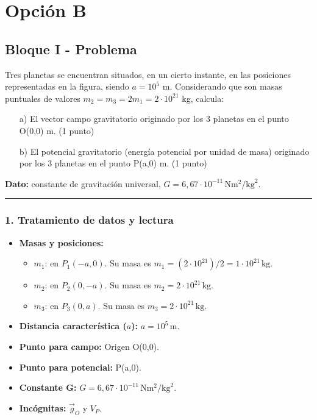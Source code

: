 \newpage

\section{Opción B}
\label{sec:B_2013_jul_ext}

\subsection{Bloque I - Problema}
\label{subsec:B1_2013_jul_ext}

\begin{cajaenunciado}
Tres planetas se encuentran situados, en un cierto instante, en las posiciones representadas en la figura, siendo $a = 10^5$ m. Considerando que son masas puntuales de valores $m_2=m_3=2m_1=2 \cdot 10^{21}$ kg, calcula:
\begin{enumerate}
    \item[a)] El vector campo gravitatorio originado por los 3 planetas en el punto O(0,0) m. (1 punto)
    \item[b)] El potencial gravitatorio (energía potencial por unidad de masa) originado por los 3 planetas en el punto P(a,0) m. (1 punto)
\end{enumerate}
\textbf{Dato:} constante de gravitación universal, $G = 6,67 \cdot 10^{-11} \, \text{N}\text{m}^2/\text{kg}^2$.
\end{cajaenunciado}
\hrule

\subsubsection*{1. Tratamiento de datos y lectura}
\begin{itemize}
    \item \textbf{Masas y posiciones:}
        \begin{itemize}
            \item $m_1$: en $P_1(-a, 0)$. Su masa es $m_1 = (2 \cdot 10^{21})/2 = 1 \cdot 10^{21}\,\text{kg}$.
            \item $m_2$: en $P_2(0, -a)$. Su masa es $m_2 = 2 \cdot 10^{21}\,\text{kg}$.
            \item $m_3$: en $P_3(0, a)$. Su masa es $m_3 = 2 \cdot 10^{21}\,\text{kg}$.
        \end{itemize}
    \item \textbf{Distancia característica ($a$):} $a = 10^5\,\text{m}$.
    \item \textbf{Punto para campo:} Origen O(0,0).
    \item \textbf{Punto para potencial:} P(a,0).
    \item \textbf{Constante G:} $G = 6,67 \cdot 10^{-11}\,\text{N}\text{m}^2/\text{kg}^2$.
    \item \textbf{Incógnitas:} $\vec{g}_O$ y $V_P$.
\end{itemize}

